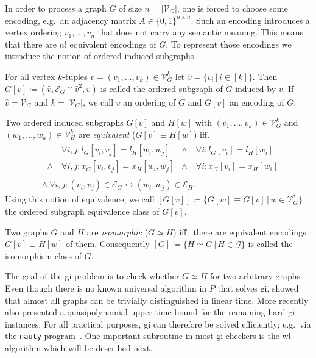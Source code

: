 In order to process a graph $G$ of size $n = |\mathcal{V}_G|$, one is forced to choose some encoding, e.g.\ an adjacency matrix $A \in {\{0, 1\}}^{n \times n}$.
Such an encoding introduces a vertex ordering $v_1, \dots, v_n$ that does not carry any semantic meaning.
This means that there are $n!$ equivalent encodings of $G$. %
To represent those encodings we introduce the notion of ordered induced subgraphs.
\begin{defn}
	For all vertex $k$-tuples $v = (v_1, \dots, v_k) \in \mathcal{V}_G^k$ let $\hat{v} = \{ v_i\, |\, i \in [k] \}$.
	Then $G[v] \coloneqq (\hat{v}, \mathcal{E}_G \cap \hat{v}^2, v)$ is called the ordered subgraph of $G$ induced by $v$.
	If $\hat{v} = \mathcal{V}_G$ and $k = |\mathcal{V}_G|$, we call $v$ an ordering of $G$ and $G[v]$ an encoding of $G$.
\end{defn}
\begin{defn}\label{defn:related:ordered-subgraph-equivalence}
	Two ordered induced subgraphs $G[v]$ and $H[w]$ with $(v_1, \dots, v_k) \in \mathcal{V}_G^k$ and $(w_1, \dots, w_k) \in \mathcal{V}_H^k$ are \textit{equivalent} ($G[v] \equiv H[w]$) iff.\
	\begin{align*}
		&\ \begin{aligned}
			&\ \forall i, j: l_G[v_i, v_j] = l_H[w_i, w_j] &\land&\ \forall i: l_G[v_i] = l_H[w_i] \\
			\land&\ \forall i, j: x_G[v_i, v_j] = x_H[w_i, w_j] &\land&\ \forall i: x_G[v_i] = x_H[w_i]
		\end{aligned}\\
		&\land\ \forall i, j: (v_i, v_j) \in \mathcal{E}_G \leftrightarrow (w_i, w_j) \in \mathcal{E}_H \text{.}
	\end{align*}
	Using this notion of equivalence, we call $[G[v]] \coloneqq \{ G[w] \equiv G[v]\, |\, w \in \mathcal{V}_G^{*} \}$ the ordered subgraph equivalence class of $G[v]$.
\end{defn}
\begin{defn}
	Two graphs $G$ and $H$ are \textit{isomorphic} ($G \simeq H$) iff.\ there are equivalent encodings $G[v] \equiv H[w]$ of them.
	Consequently $[G] \coloneqq \{ H \simeq G\, |\, H \in \mathcal{G} \}$ is called the isomorphism class of $G$.
\end{defn}
The goal of the \ac{gi} problem is to check whether $G \simeq H$ for two arbitrary graphs.
Even though there is no known universal algorithm in $P$ that solves \ac{gi}, \citet{Babai1980} showed that almost all graphs can be trivially distinguished in linear time.
More recently \citet{Babai2015} also presented a quasipolynomial upper time bound for the remaining hard \ac{gi} instances.
For all practical purposes, \ac{gi} can therefore be solved efficiently; e.g.\ via the \texttt{nauty} program~\cite{McKay}\cite{McKay2013}.
One important subroutine in most \ac{gi} checkers is the \acl{wl} algorithm which will be described next.

